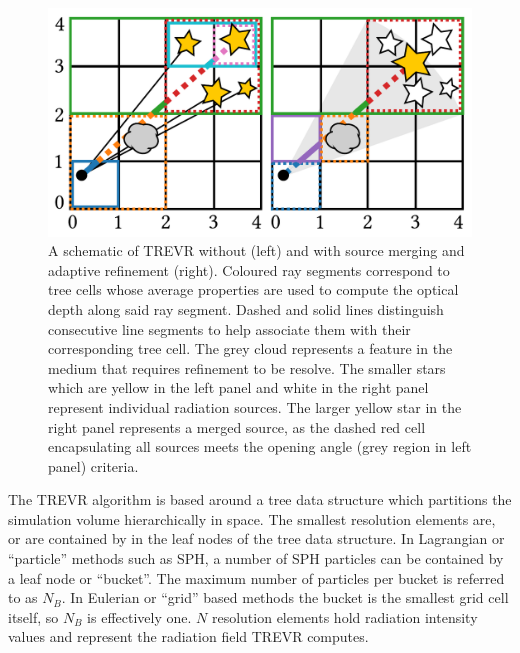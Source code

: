 \documentclass[fleq,usenatbib]{mnras}
\newcommand{\acro}{TREVR}
\begin{document}
\begin{figure}
\includegraphics[width=1\linewidth]{Figures/algorithm.pdf}
\caption{A schematic of \acro{} without (left) and with source merging and 
adaptive refinement (right). Coloured ray segments correspond to tree cells 
whose average properties are used to compute the optical depth along said ray 
segment. Dashed and solid lines distinguish consecutive line segments to 
help associate them with their corresponding tree cell. The grey cloud 
represents a feature in the medium that requires refinement to be resolve. 
The smaller stars which are yellow in the left panel and white in the right 
panel represent individual radiation sources. The larger yellow star in the 
right panel represents a merged source, as the dashed red cell encapsulating 
all sources meets the opening angle (grey region in left panel) criteria.} 

\label{fig:algorithm}
\end{figure}
The \acro{} algorithm is based around a tree data structure which partitions 
the simulation volume hierarchically in space. The smallest resolution 
elements are, or are contained by in the leaf nodes of the tree data 
structure. In Lagrangian or ``particle'' methods such as SPH, a number of SPH 
particles can be contained by a leaf node or ``bucket''. The maximum number of 
particles per bucket is referred to as $N_B$. In Eulerian or ``grid'' based 
methods the bucket is the smallest grid cell itself, so $N_B$ is effectively 
one. $N$ resolution elements hold radiation intensity values and represent the 
radiation field \acro{} computes. 
\end{document}
